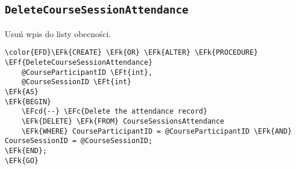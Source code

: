 \documentclass[11pt]{article}
\newcommand{\EFc}[1]{\textcolor{EFc}{\textit{#1}}} %
\newcommand{\EFcd}[1]{\textcolor{EFcd}{\textit{#1}}} %
\newcommand{\EFk}[1]{\textcolor{EFk}{\textbf{#1}}} %
\newcommand{\EFf}[1]{\textcolor{EFf}{#1}} %
\newcommand{\EFt}[1]{\textcolor{EFt}{\textbf{#1}}} %
\begin{document}
\subsection{\texttt{DeleteCourseSessionAttendance}}
\label{sec:org2ae1983}
Usuń wpis do listy obecności.
\begin{Code}
\begin{Verbatim}
\color{EFD}\EFk{CREATE} \EFk{OR} \EFk{ALTER} \EFk{PROCEDURE} \EFf{DeleteCourseSessionAttendance}
    @CourseParticipantID \EFt{int},
    @CourseSessionID \EFt{int}
\EFk{AS}
\EFk{BEGIN}
    \EFcd{--} \EFc{Delete the attendance record}
    \EFk{DELETE} \EFk{FROM} CourseSessionsAttendance
    \EFk{WHERE} CourseParticipantID = @CourseParticipantID \EFk{AND} CourseSessionID = @CourseSessionID;
\EFk{END};
\EFk{GO}
\end{Verbatim}
\end{Code}
\end{document}
